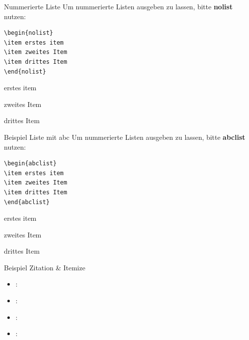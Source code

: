 \documentclass[11pt]{beamer}
\begin{document}
\begin{frame}[fragile]{Nummerierte Liste}
Um nummerierte Listen ausgeben zu lassen, bitte \textbf{nolist} nutzen:

\begin{verbatim}
\begin{nolist}
\item erstes item
\item zweites Item
\item drittes Item
\end{nolist}
\end{verbatim}

	\begin{nolist}
		\item erstes item
		\item zweites Item
		\item drittes Item
	\end{nolist}
\end{frame}

\begin{frame}[fragile]{Beispiel Liste mit abc}
Um nummerierte Listen ausgeben zu lassen, bitte \textbf{abclist} nutzen:

\begin{verbatim}
\begin{abclist}
\item erstes item
\item zweites Item
\item drittes Item
\end{abclist}
\end{verbatim}

	\begin{abclist}
		\item erstes item
		\item zweites Item
		\item drittes Item
	\end{abclist}
\end{frame}


\begin{frame}{Beispiel Zitation \& Itemize}
	\begin{itemize}
		\item \cite{Welzel2013}: 
		\item \cite{Inglehart2010}: 
		\item \cite{Scherer2020}:
		\item \cite{Welzel2009}:
	\end{itemize}
\end{frame}
\end{document}
